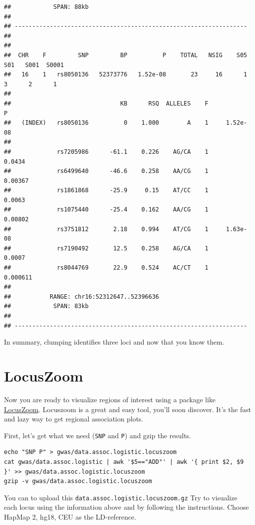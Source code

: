 \documentclass[
]{book}
\newcommand{\passthrough}[1]{#1}
\begin{document}
\begin{lstlisting}
##            SPAN: 88kb
## 
## ------------------------------------------------------------------
## 
## 
##  CHR    F         SNP         BP          P    TOTAL   NSIG    S05    S01   S001  S0001
##   16    1   rs8050136   52373776   1.52e-08       23     16      1      3      2      1 
## 
##                               KB      RSQ  ALLELES    F            P 
##   (INDEX)   rs8050136          0    1.000        A    1     1.52e-08 
## 
##             rs7205986      -61.1    0.226    AG/CA    1       0.0434 
##             rs6499640      -46.6    0.258    AA/CG    1      0.00367 
##             rs1861868      -25.9     0.15    AT/CC    1       0.0063 
##             rs1075440      -25.4    0.162    AA/CG    1      0.00802 
##             rs3751812       2.18    0.994    AT/CG    1     1.63e-08 
##             rs7190492       12.5    0.258    AG/CA    1       0.0007 
##             rs8044769       22.9    0.524    AC/CT    1     0.000611 
## 
##           RANGE: chr16:52312647..52396636
##            SPAN: 83kb
## 
## ------------------------------------------------------------------
\end{lstlisting}

In summary, clumping identifies three loci and now that you know them.

\hypertarget{locuszoom}{%
\section{LocusZoom}\label{locuszoom}}

Now you are ready to visualize regions of interest using a package like \href{http://locuszoom.org}{LocusZoom}. Locuszoom is a great and easy tool, you'll soon discover. It's the fast and lazy way to get regional association plots.

First, let's get what we need (\passthrough{\lstinline!SNP!} and \passthrough{\lstinline!P!}) and gzip the results.

\begin{lstlisting}
echo "SNP P" > gwas/data.assoc.logistic.locuszoom
cat gwas/data.assoc.logistic | awk '$5=="ADD"' | awk '{ print $2, $9 }' >> gwas/data.assoc.logistic.locuszoom
gzip -v gwas/data.assoc.logistic.locuszoom
\end{lstlisting}

You can to upload this \passthrough{\lstinline!data.assoc.logistic.locuszoom.gz!} Try to visualize each locus using the information above and by following the instructions. Choose HapMap 2, hg18, CEU as the LD-reference.
\end{document}
